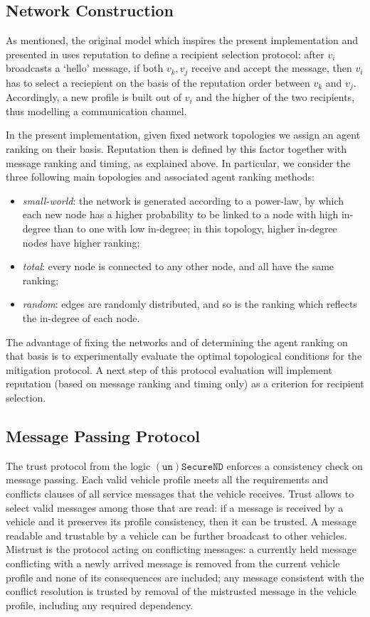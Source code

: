 \documentclass[compsoc, conference, letterpaper, 10pt, times]{IEEEtran}
\begin{document}
\subsection{Network Construction}\label{sec:network}

As mentioned, the original model which inspires the present implementation and presented in \cite{glenford} uses reputation to define a recipient selection protocol: after $v_{i}$ broadcasts a `hello' message, if both $v_{k}, v_{j}$ receive and accept the message, then $v_{i}$ has to select a reciepient on the basis of the reputation order between $v_{k}$ and $v_{j}$. Accordingly, a new profile is built out of $v_{i}$ and the higher of the two recipients, thus modelling a communication channel.

In the present implementation, given fixed network topologies we assign an agent ranking on their basis. Reputation then is defined by this factor together with message ranking and timing, as explained above. In particular, we consider the three following main topologies and associated agent ranking methods:

\begin{itemize}
\item \textit{small-world}: the network is generated according to a power-law, by which each new node has a higher probability to be linked to a node with high in-degree than to one with low in-degree; in this topology, higher in-degree nodes have higher ranking;
\item \textit{total}: every node is connected to any other node, and all have the same ranking;
\item \textit{random}: edges are randomly distributed, and so is the ranking which reflects the in-degree of each node.
\end{itemize}
The advantage of fixing the networks and of determining the agent ranking on that basis is to experimentally evaluate the optimal topological conditions for the mitigation protocol. A next step of this protocol evaluation will implement reputation (based on message ranking and timing only) as a criterion for recipient selection.

\subsection{Message Passing Protocol}

The trust protocol from the logic $\mathtt{(un)SecureND}$ enforces a consistency check on message passing. Each valid vehicle profile meets all the requirements and conflicts clauses of all service messages that the vehicle receives. Trust allows to select valid messages among those that are read: if a message is received by a vehicle and it preserves its profile consistency, then it can be trusted. A message readable and trustable by a vehicle can be further broadcast to other vehicles. Mistrust is the protocol acting on conflicting messages: a currently held message conflicting with a newly arrived message is removed from the current vehicle profile and none of its consequences are included; any message consistent with the conflict resolution is trusted by removal of the mistrusted message in the vehicle profile, including any required dependency.
\end{document}
